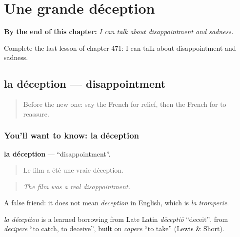 
\chapter{Une grande déception}
\label{ch:fr-une-grande-deception}

\begin{chapteropening}
\textbf{By the end of this chapter:} \emph{I can talk about disappointment and sadness.}

Complete the last lesson of chapter 471: I can talk about disappointment and sadness.
\end{chapteropening}

\section[la déception]{la déception — disappointment}

\label{lesson:FR-C471-deception}



\begin{quote}
Before the new one: say the French for relief, then the French for to reassure.
\end{quote}

\subsection*{You'll want to know: la déception}
\textbf{la déception} — \textquotedblleft{}disappointment\textquotedblright{}.

\begin{quote}
Le film a été une vraie déception.
\end{quote}

\begin{quote}
\emph{The film was a real disappointment.}
\end{quote}

A false friend: it does not mean \emph{deception} in English, which is \emph{la tromperie}.

\begin{cousinweb}
\emph{la déception} is a learned borrowing from Late Latin \emph{dēceptiō} \textquotedblleft{}deceit\textquotedblright{}, from \emph{dēcipere} \textquotedblleft{}to catch, to deceive\textquotedblright{}, built on \emph{capere} \textquotedblleft{}to take\textquotedblright{} (Lewis \& Short).
\end{cousinweb}

